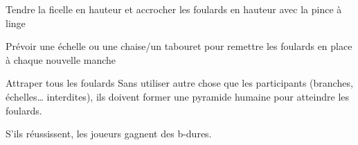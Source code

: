 \documentclass{grand-jeu}
\begin{document}
\begin{liste-materiel}
\end{liste-materiel}

\begin{installation}
Tendre la ficelle en hauteur et accrocher les foulards en hauteur avec la pince à linge

Prévoir une échelle ou une chaise/un tabouret pour remettre les foulards en place à chaque nouvelle manche
\end{installation}

\begin{regles}
Attraper tous les foulards
Sans utiliser autre chose que les participants (branches, échelles… interdites), ils doivent former une pyramide humaine pour atteindre les foulards.

S'ils réussissent, les joueurs gagnent des b-dures. 
\end{regles}

\begin{imaginaire}

\end{imaginaire}

\begin{moments-stop}
\end{moments-stop}
\end{document}
